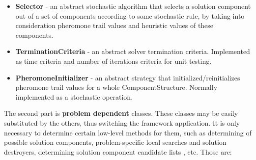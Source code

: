 \documentclass[11pt,a4paper,oneside]{book}
\begin{document}
\begin{itemize}
\item \textbf{Selector} - an abstract stochastic algorithm that selects a solution component out of a set of components according to some stochastic rule, by taking into consideration pheromone trail values and heuristic values of these components.

\item \textbf{TerminationCriteria} - an abstract solver termination criteria. Implemented as time criteria and number of iterations criteria for unit testing.

\item \textbf{PheromoneInitializer} - an abstract strategy that initialized/reinitializes pheromone trail values for a whole ComponentStructure. Normally implemented as a stochastic operation.

\end{itemize}

The second part is \textbf{problem dependent} classes. These classes may be easily substituted by the others, thus switching the framework application. It is only necessary to determine certain low-level methods for them, such as determining of possible solution components, problem-specific local searches and solution destroyers, determining solution component candidate lists , etc. Those are:
\end{document}
